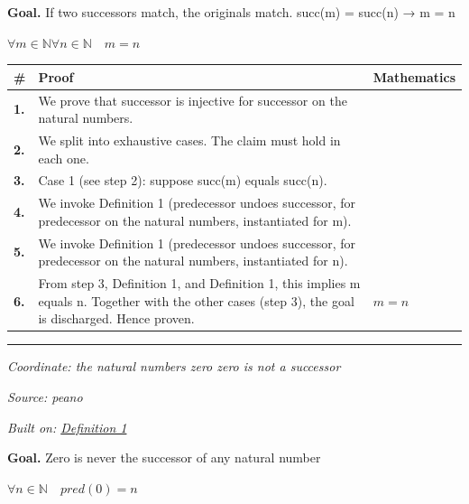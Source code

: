 \documentclass[11pt]{article}
\theoremstyle{definition}
\begin{document}
\medskip
\noindent\textbf{Goal.} If two successors match, the originals match.  succ(m) = succ(n) → m = n\par
\noindent$\displaystyle \forall m \in \mathbb{N} \forall n \in \mathbb{N}\quad m = n$\par
\medskip
\noindent
\begin{tabular}{@{} >{\raggedright\arraybackslash}p{} >{\raggedright\arraybackslash}p{} >{\raggedleft\arraybackslash}p{} @{}}
\textbf{\#} & \textbf{Proof} & \textbf{Mathematics} \\
\midrule
\textbf{1.} & We prove that successor is injective for successor on the natural numbers. & \\[0.45em]
\textbf{2.} & We split into exhaustive cases. The claim must hold in each one. & \\[0.45em]
\textbf{3.} & Case 1 (see step 2): suppose succ(m)  equals  succ(n). & \\[0.45em]
\textbf{4.} & We invoke Definition 1 (predecessor undoes successor, for predecessor on the natural numbers, instantiated for m). & \\[0.45em]
\textbf{5.} & We invoke Definition 1 (predecessor undoes successor, for predecessor on the natural numbers, instantiated for n). & \\[0.45em]
\textbf{6.} & From step 3, Definition 1, and Definition 1, this implies m equals n. Together with the other cases (step 3), the goal is discharged. Hence proven. & $\displaystyle m = n$ \\[0.45em]
\bottomrule
\end{tabular}
\label{thm:Nat-successor-successor_is_injective}
\par\medskip\hrule
\bigskip
{}\par
\smallskip\noindent\textit{Coordinate: the natural numbers \cdot zero \cdot zero is not a successor}\par
\smallskip\noindent\textit{Source: peano}\par
\smallskip\noindent\textit{Built on: \hyperref[thm:Nat-predecessor-predecessor_undoes_successor]{Definition 1}}\par
\medskip
\noindent\textbf{Goal.} Zero is never the successor of any natural number\par
\noindent$\displaystyle \forall n \in \mathbb{N}\quad pred(0) = n$\par
\end{document}
